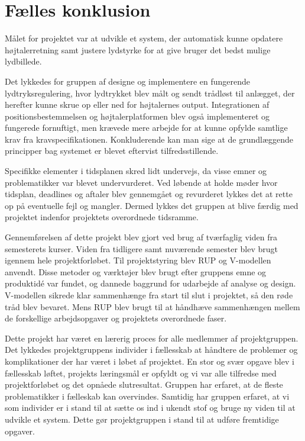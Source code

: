 \section{Fælles konklusion}
\label{chap:fallesKonklusion}

Målet for projektet var at udvikle et system, der automatisk kunne opdatere højtalerretning samt justere lydstyrke for at give bruger det bedst mulige lydbillede. %

Det lykkedes for gruppen af designe og implementere en fungerende lydtryksregulering, hvor lydtrykket blev målt og sendt trådløst til anlægget, der herefter kunne skrue op eller ned for højtalernes output. Integrationen af positionsbestemmelsen og højtalerplatformen blev også implementeret og fungerede fornuftigt, men krævede mere arbejde for at kunne opfylde samtlige krav fra kravspecifikationen. Konkluderende kan man sige at de grundlæggende principper bag systemet er blevet eftervist tilfredsstillende.


Specifikke elementer i tidsplanen skred lidt undervejs, da visse emner og problematikker var blevet undervurderet. Ved løbende at holde møder hvor tidsplan, deadlines og aftaler blev gennemgået og revurderet lykkes det at rette op på eventuelle fejl og mangler. Dermed lykkes det gruppen at blive færdig med projektet indenfor projektets overordnede tidsramme.

Gennemførelsen af dette projekt blev gjort ved brug af tværfaglig viden fra semesterets kurser.
Viden fra tidligere samt nuværende semester blev brugt igennem hele projektforløbet. Til projektstyring
blev RUP og V-modellen anvendt. Disse metoder og værktøjer blev brugt efter gruppens
emne og produktidé var fundet, og dannede baggrund for udarbejde af analyse og design.
V-modellen sikrede klar sammenhænge fra start til slut i projektet, så den røde tråd blev bevaret.
Mens RUP blev brugt til at håndhæve sammenhængen mellem de forskellige arbejdsopgaver og projektets overordnede faser. 

Dette projekt har været en lærerig proces for alle medlemmer af projektgruppen. Det lykkedes projektgruppens individer i fællesskab at håndtere de problemer og komplikationer der har været i løbet af projektet. En stor og svær opgave
blev i fællesskab løftet, projekts læringsmål er opfyldt og vi var alle tilfredse med projektforløbet og det opnåede slutresultat.  
Gruppen har erfaret, at de fleste problematikker i fælleskab kan overvindes. Samtidig har gruppen erfaret, at vi som individer er i stand til at sætte os ind i ukendt stof og bruge ny viden til at udvikle et system. Dette gør projektgruppen i stand til at udføre fremtidige opgaver. 

